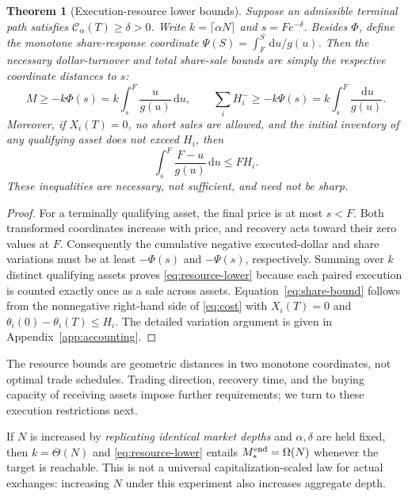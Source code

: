 \documentclass[11pt]{article}
\numberwithin{equation}{section}
\newtheorem{theorem}{Theorem}[section]
\theoremstyle{definition}
\theoremstyle{remark}
\newcommand{\Cris}{\mathcal{C}}
\newcommand{\dd}{\,\mathrm{d}}
\begin{document}
\begin{theorem}[Execution-resource lower bounds]\label{thm:resource}
Suppose an admissible terminal path satisfies $\Cris_\alpha(T)\ge\delta>0$. Write $k=\lceil\alpha N\rceil$ and $s=Fe^{-\delta}$. Besides $\Phi$, define the monotone share-response coordinate $\Psi(S)=\int_F^S\dd u/g(u)$. Then the necessary dollar-turnover and total share-sale bounds are simply the respective coordinate distances to $s$:
\begin{equation}\label{eq:resource-lower}
\boxed{M\ge -k\Phi(s)=k\int_s^F\frac{u}{g(u)}\dd u,\qquad
\sum_iH_i^-\ge -k\Psi(s)=k\int_s^F\frac{\dd u}{g(u)}.}
\end{equation}
Moreover, if $X_i(T)=0$, no short sales are allowed, and the initial inventory of any qualifying asset does not exceed $H_i$, then
\begin{equation}\label{eq:share-bound}
\boxed{\int_s^F\frac{F-u}{g(u)}\dd u\le FH_i.}
\end{equation}
These inequalities are necessary, not sufficient, and need not be sharp.
\end{theorem}
\begin{proof}
For a terminally qualifying asset, the final price is at most $s<F$. Both transformed coordinates increase with price, and recovery acts toward their zero values at $F$. Consequently the cumulative negative executed-dollar and share variations must be at least $-\Phi(s)$ and $-\Psi(s)$, respectively. Summing over $k$ distinct qualifying assets proves \eqref{eq:resource-lower} because each paired execution is counted exactly once as a sale across assets. Equation~\eqref{eq:share-bound} follows from the nonnegative right-hand side of \eqref{eq:cost} with $X_i(T)=0$ and $\theta_i(0)-\theta_i(T)\le H_i$. The detailed variation argument is given in Appendix~\ref{app:accounting}.
\end{proof}

The resource bounds are geometric distances in two monotone coordinates, not optimal trade schedules. Trading direction, recovery time, and the buying capacity of receiving assets impose further requirements; we turn to these execution restrictions next.

If $N$ is increased by \emph{replicating identical market depths} and $\alpha,\delta$ are held fixed, then $k=\Theta(N)$ and \eqref{eq:resource-lower} entails $M_*^{\rm end}=\Omega(N)$ whenever the target is reachable. This is not a universal capitalization-scaled law for actual exchanges: increasing $N$ under this experiment also increases aggregate depth.
\end{document}
